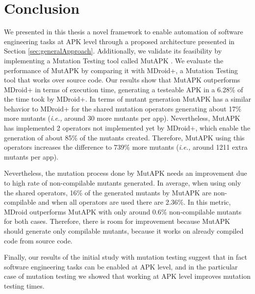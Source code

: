 
\chapter{Conclusion} %

\label{ChapterConclusion} %

We presented in this thesis a novel framework to enable automation of software engineering tasks at APK level through a proposed architecture presented in Section \ref{sec:generalApproach}. Additionally, we validate its feasibility by implementing a Mutation Testing tool called MutAPK \cite{MutAPK}. We evaluate the performance of MutAPK by comparing it with MDroid+, a Mutation Testing tool that works over source code. Our results show that MutAPK outperforms MDroid+ in terms of execution time, generating a testeable APK in a 6.28\% of the time took by MDroid+. In terms of mutant generation MutAPK has a similar behavior to MDroid+ for the shared mutation operators generating about 17\% more mutants (\textit{i.e.,} around 30 more mutants per app). Nevertheless, MutAPK has implemented 2 operators not implemented yet by MDroid+, which enable the generation of about  85\% of the mutants created. Therefore, MutAPK using this operators increases the difference to 739\% more mutants (\textit{i.e.,} around 1211 extra mutants per app).

Nevertheless, the mutation process done by MutAPK needs an improvement due to high rate of non-compilable mutants generated. In average, when using only the shared operators, 16\% of the generated mutants by MutAPK are non-compilable and when all operators are used there are 2.36\%. In this metric, MDroid outperforms MutAPK with only around 0.6\% non-compilable mutants for both cases. Therefore, there is room for improvement because MutAPK should generate only compilable mutants, because it works on already compiled code from source code.

Finally, our results of the initial study with mutation testing suggest that in fact software engineering tasks can be enabled at APK level, and in the particular case of mutation testing we showed that working at APK level improves mutation testing times.